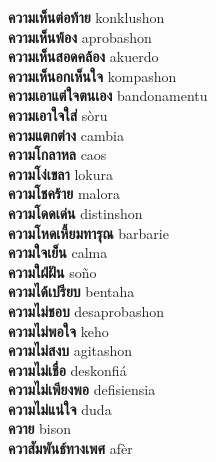 \textbf{ ความเห็นต่อท้าย  } konklushon \\
\textbf{ ความเห็นพ้อง  } aprobashon \\
\textbf{ ความเห็นสอดคล้อง  } akuerdo \\
\textbf{ ความเห็นอกเห็นใจ  } kompashon \\
\textbf{ ความเอาแต่ใจตนเอง  } bandonamentu \\
\textbf{ ความเอาใจใส่  } sòru \\
\textbf{ ความแตกต่าง  } cambia \\
\textbf{ ความโกลาหล  } caos \\
\textbf{ ความโง่เขลา  } lokura \\
\textbf{ ความโชคร้าย  } malora \\
\textbf{ ความโดดเด่น  } distinshon \\
\textbf{ ความโหดเหี้ยมทารุณ  } barbarie \\
\textbf{ ความใจเย็น  } calma \\
\textbf{ ความใฝ่ฝัน  } soño \\
\textbf{ ความได้เปรียบ  } bentaha \\
\textbf{ ความไม่ชอบ  } desaprobashon \\
\textbf{ ความไม่พอใจ  } keho \\
\textbf{ ความไม่สงบ  } agitashon \\
\textbf{ ความไม่เชื่อ  } deskonfiá \\
\textbf{ ความไม่เพียงพอ  } defisiensia \\
\textbf{ ความไม่แน่ใจ  } duda \\
\textbf{ ควาย  } bison \\
\textbf{ ควาสัมพันธ์ทางเพศ  } afèr \\
